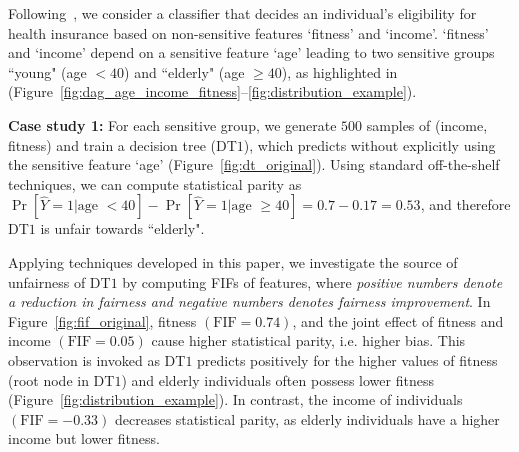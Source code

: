 

\begin{example}
	\label{ex:motivating_example}
 Following~\cite{ghosh2020justicia}, we consider a classifier that decides an individual's eligibility for health insurance based on non-sensitive features `fitness' and `income'.
	`fitness' and `income' depend on a sensitive feature `age' leading to two sensitive groups ``young" (age $ < 40 $) and ``elderly" (age $ \ge 40 $), as highlighted in (Figure~\ref{fig:dag_age_income_fitness}--\ref{fig:distribution_example}). 
	
	\textbf{Case study 1:} For each sensitive group, we generate $ 500 $ samples of (income, fitness) and train a decision tree (DT$ 1 $), which predicts without explicitly using the sensitive feature `age' (Figure~\ref{fig:dt_original}). %
	Using standard off-the-shelf techniques, we can compute statistical parity as $ \Pr[\widehat{Y} = 1 | \text{age } < 40] - \Pr[\widehat{Y} = 1 | \text{age } \ge 40] = 0.7 - 0.17 = 0.53 $, and therefore DT$ 1 $ is unfair towards ``elderly".
	
	Applying techniques developed in this paper, we  investigate the source of unfairness of DT$ 1 $ by computing FIFs of features, where \emph{positive numbers denote a reduction in fairness and negative numbers denotes fairness improvement}. In Figure~\ref{fig:fif_original}, fitness $(\mathrm{FIF} = 0.74)$, and the joint effect of fitness and income $(\mathrm{FIF}  = 0.05)$ cause higher statistical parity, i.e. higher bias. This observation is invoked as DT$ 1 $ predicts positively for the higher values of fitness (root node in DT$ 1 $) and elderly individuals often possess lower fitness (Figure~\ref{fig:distribution_example}). In contrast, the income of individuals  $(\mathrm{FIF}  = -0.33)$ decreases statistical parity, as elderly individuals have a higher income but lower fitness.
	

\end{example}
